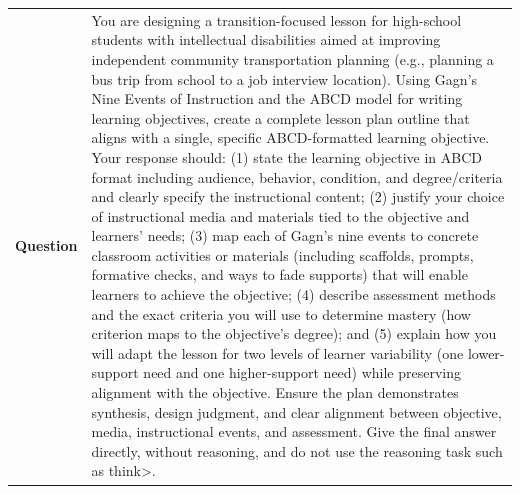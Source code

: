 \begin{longtable}{@{}l p{12.5cm}@{}}
  \textbf{Question} & You are designing a transition-focused lesson for high-school students with intellectual disabilities aimed at improving independent community transportation planning (e.g., planning a bus trip from school to a job interview location). Using Gagn's Nine Events of Instruction and the ABCD model for writing learning objectives, create a complete lesson plan outline that aligns with a single, specific ABCD-formatted learning objective. Your response should: (1) state the learning objective in ABCD format including audience, behavior, condition, and degree/criteria and clearly specify the instructional content; (2) justify your choice of instructional media and materials tied to the objective and learners' needs; (3) map each of Gagn's nine events to concrete classroom activities or materials (including scaffolds, prompts, formative checks, and ways to fade supports) that will enable learners to achieve the objective; (4) describe assessment methods and the exact criteria you will use to determine mastery (how criterion maps to the objective's degree); and (5) explain how you will adapt the lesson for two levels of learner variability (one lower-support need and one higher-support need) while preserving alignment with the objective. Ensure the plan demonstrates synthesis, design judgment, and clear alignment between objective, media, instructional events, and assessment. \newline Give the final answer directly, without reasoning, and do not use the reasoning task such as think\textgreater{}. \\

\end{longtable}
